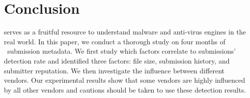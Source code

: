 \section{Conclusion}
\label{sec:con}

\vt{} serves as a fruitful resource to understand malware and anti-virus engines in the real world. 
In this paper, 
we conduct a thorough study on four months of \vt\ submission metadata.
We first study which factors correlate to submissions' detection rate 
and identified three factors: file size, submission history, and submitter reputation.
We then investigate the influence between different vendors. 
Our experimental results show that   
some vendors are highly influenced by all other vendors
and cautions should be taken to use these detection results.
